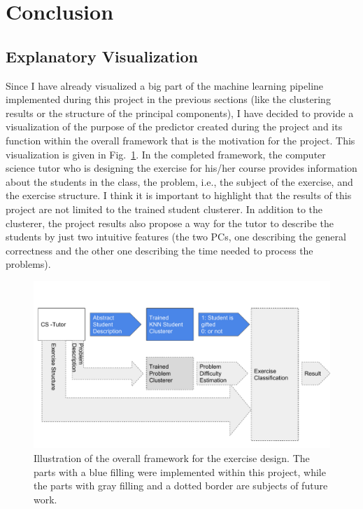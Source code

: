 \section{Conclusion}

\subsection{Explanatory Visualization}
Since I have already visualized a big part of the machine learning pipeline implemented during this project in the previous sections (like the clustering results or the structure of the principal components), I have decided to provide a visualization of the purpose of the predictor created during the project and its function within the overall framework that is the motivation for the project. This visualization is given in Fig.~\ref{fig_expl_viz}. In the completed framework, the computer science tutor who is designing the exercise for his/her course provides information about the students in the class, the problem, i.e., the subject of the exercise, and the exercise structure. I think it is important to highlight that the results of this project are not limited to the trained student clusterer. In addition to the clusterer, the project results also propose a way for the tutor to describe the students by just two intuitive features (the two PCs, one describing the general correctness and the other one describing the time needed to process the problems).  

 \begin{figure}
 	\centering
 	\includegraphics[width=\textwidth]{./img/explViz.pdf}
 	\caption{Illustration of the overall framework for the exercise design. The parts with a blue filling were implemented within this project, while the parts with gray filling and a dotted border are subjects of future work.\label{fig_expl_viz}}
 \end{figure}


